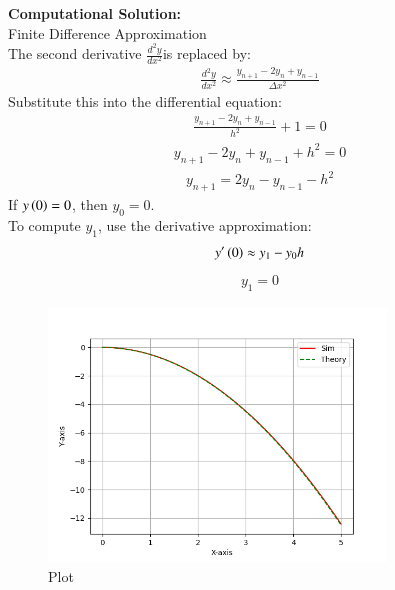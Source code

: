\documentclass[journal]{IEEEtran}
\numberwithin{equation}{enumi}
\numberwithin{figure}{enumi}
\begin{document}
\textbf{Computational Solution:} \\
Finite Difference Approximation \\
The second derivative $\frac{d^2y}{dx^2}$is replaced by:\\
\begin{align}
	\frac{d^2y}{dx^2} \approx \frac{y_{n+1} - 2y_n + y_{n-1}}{\Delta x^2}
\end{align}
Substitute this into the differential equation:
\begin{align}
	\frac{y_{n+1} - 2y_n + y_{n-1}}{h^2} + 1 = 0
\end{align}
\begin{align}
	y_{n+1} - 2y_n + y_{n-1} + h^2 = 0
\end{align}
\begin{align}
	y_{n+1} = 2y_n - y_{n-1} - h^2
\end{align}
If $y\left(0\right) = 0$, then $y_0 = 0$. \\
To compute $y_1$, use the derivative approximation:
\begin{align}
	y^{\prime}\left(0\right) \approx {y_1 - y_0}{h}
\end{align}
\begin{align}
	y_1 = 0
\end{align}



\begin{figure}[H]
    \centering
    \includegraphics[width=0.8\textwidth]{figs/fig.png}
    \caption{Plot}
\end{figure}
\end{document}
